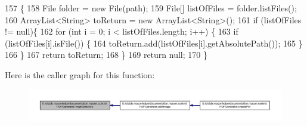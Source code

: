\begin{DoxyCode}
157                                                          \{
158         File folder = \textcolor{keyword}{new} File(path);
159         File[] listOfFiles = folder.listFiles();
160         ArrayList<String> toReturn = \textcolor{keyword}{new} ArrayList<String>();
161         \textcolor{keywordflow}{if} (listOfFiles != null)\{
162             \textcolor{keywordflow}{for} (\textcolor{keywordtype}{int} i = 0; i < listOfFiles.length; i++) \{
163               \textcolor{keywordflow}{if} (listOfFiles[i].isFile()) \{
164                 toReturn.add(listOfFiles[i].getAbsolutePath());
165               \}
166             \}
167             \textcolor{keywordflow}{return} toReturn;
168         \}
169         \textcolor{keywordflow}{return} null;
170     \}
\end{DoxyCode}


Here is the caller graph for this function\-:\nopagebreak
\begin{figure}[H]
\begin{center}
\leavevmode
\includegraphics[width=350pt]{classit_1_1isislab_1_1masonhelperdocumentation_1_1mason_1_1control_1_1_p_d_f_generator_a9fa1dfe581da4d09e9c7bee1a8b12972_icgraph}
\end{center}
\end{figure}




